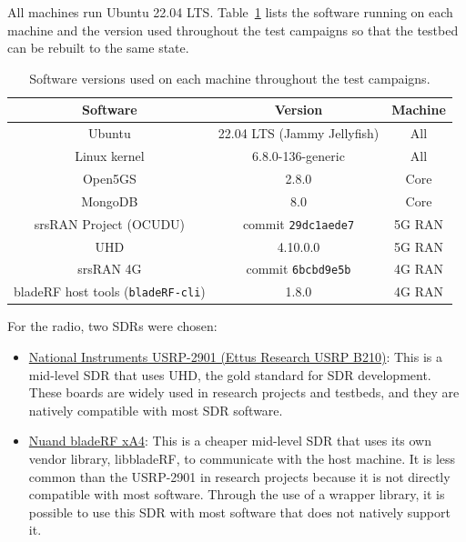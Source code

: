 All machines run Ubuntu 22.04 LTS. Table~\ref{tab:software-versions} lists the software running on each machine and the version used throughout the test campaigns so that the testbed can be rebuilt to the same state.

\begin{table}[htbp]
    \centering
    \begin{tabular}{|c|c|c|}
        \hline
        \textbf{Software} & \textbf{Version} & \textbf{Machine} \\
        \hline
        Ubuntu & 22.04 LTS (Jammy Jellyfish) & All \\
        \hline
        Linux kernel & 6.8.0-136-generic & All \\
        \hline
        Open5GS & 2.8.0 & Core \\
        \hline
        MongoDB & 8.0 & Core \\
        \hline
        srsRAN Project (OCUDU) & commit \texttt{29dc1aede7} & 5G \gls{RAN} \\
        \hline
        UHD & 4.10.0.0 & 5G \gls{RAN} \\
        \hline
        srsRAN 4G & commit \texttt{6bcbd9e5b} & 4G \gls{RAN} \\
        \hline
        bladeRF host tools (\texttt{bladeRF-cli}) & 1.8.0 & 4G \gls{RAN} \\
        \hline
    \end{tabular}
    \caption{Software versions used on each machine throughout the test campaigns.}
    \label{tab:software-versions}
\end{table}

For the radio, two \glspl{SDR} were chosen:
\begin{itemize}
    \item \underline {National Instruments USRP-2901 (Ettus Research USRP B210)}: This is a mid-level \gls{SDR} that uses \gls{UHD}, the gold standard for \gls{SDR} development. These boards are widely used in research projects and testbeds, and they are natively compatible with most \gls{SDR} software.
    \item \underline{Nuand bladeRF xA4}: This is a cheaper mid-level \gls{SDR} that uses its own vendor library, libbladeRF, to communicate with the host machine. It is less common than the USRP-2901 in research projects because it is not directly compatible with most software. Through the use of a wrapper library, it is possible to use this \gls{SDR} with most software that does not natively support it.
\end{itemize}

